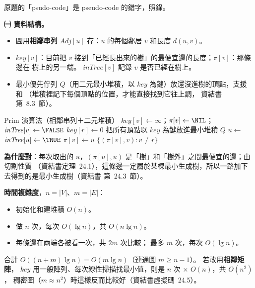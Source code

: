 \begin{pastsoln}
原題的「psudo-code」是 pseudo-code 的錯字，照錄。

\textbf{㈠ 資料結構。}
\begin{itemize}[nosep]
\item 圖用\textbf{相鄰串列} $\mathit{Adj}[u]$ 存：$u$ 的每個鄰居 $v$ 和長度 $d(u, v)$。
\item $\mathit{key}[v]$：目前把 $v$ 接到「已經長出來的樹」的最便宜邊的長度；$\pi[v]$：那條邊在
樹上的另一端。 $\mathit{inTree}[v]$ 記錄 $v$ 是否已經在樹上。
\item 最小優先佇列 $Q$（用二元最小堆積，以 $\mathit{key}$ 為鍵）放還沒進樹的頂點，支援
 和 （堆積裡記下每個頂點的位置，才能直接找到它往上調，
資結書第~8.3~節）。
\end{itemize}
\begin{pseudo}{Prim 演算法（相鄰串列＋二元堆積）}
        \State $\mathit{key}[v] \gets \infty$；$\pi[v] \gets \NIL$；$\mathit{inTree}[v] \gets \FALSE$
    \EndFor
    \State $\mathit{key}[r] \gets 0$
    \State 把所有頂點以 $\mathit{key}$ 為鍵放進最小堆積 $Q$
        \State $u \gets$  
        \State $\mathit{inTree}[u] \gets \TRUE$ 
                \State $\pi[v] \gets u$
                \State {}
            \EndIf
        \EndFor
    \EndWhile
    \State \Return $\{(\pi[v], v) : v \ne r\}$
\EndProcedure
\end{pseudo}
\textbf{為什麼對}：每次取出的 $u$，$(\pi[u], u)$ 是「樹」和「樹外」之間最便宜的邊；由切割性質
（資結書定理~24.1），這條邊一定屬於某棵最小生成樹，所以一路加下去得到的是最小生成樹（資結書
第~24.3~節）。

\textbf{時間複雜度}，$n = |V|$、$m = |E|$：
\begin{itemize}[nosep]
\item 初始化和建堆積 $O(n)$。
\item {} 做 $n$ 次，每次 $O(\lg n)$，共 $O(n \lg n)$。
\item 每條邊在兩端各被看一次，共 $2m$ 次比較； 最多 $m$ 次，每次 $O(\lg n)$。
\end{itemize}
合計 $O((n + m) \lg n) = O(m \lg n)$（連通圖 $m \ge n - 1$）。 若改用\textbf{相鄰矩陣}，
$\mathit{key}$ 用一般陣列、每次線性掃描找最小值，則是 $n$ 次 $\times$ $O(n)$，共 $O(n^2)$，
稠密圖（$m \approx n^2$）時這樣反而比較好（資結書虛擬碼~24.5）。


\end{pastsoln}
